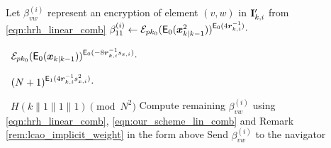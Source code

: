 \documentclass[10pt,letterpaper,oneside,twocolumn,journal]{IEEEtran}
\theoremstyle{definition}
\theoremstyle{definition}
\theoremstyle{remark}
\begin{document}
\begin{algorithm}[htbp]
\begin{algorithmic}[1]
    \State Let $\beta_{vw}^{(i)}$ represent an encryption of element $(v,w)$ in ${{\mathbf{I}}}'_{k,i}$ from \eqref{eqn:hrh_linear_comb}
    \State $\beta_{11}^{(i)} \gets \mathcal{E}_{pk_0}(\mathsf{E}_{0}({\boldsymbol{x}}^2_{k|k-1}))^{\mathsf{E}_{0}(4{\boldsymbol{r}}_{k, i}^{-1})}\cdot$\par
    \ $\mathcal{E}_{pk_0}(\mathsf{E}_{0}({\boldsymbol{x}}_{k|k-1}))^{\mathsf{E}_{0}(-8{\boldsymbol{r}}_{k, i}^{-1}s_{x,i})}\cdot$\par
    \ $(N+1)^{\mathsf{E}_{1}(4{\boldsymbol{r}}_{k, i}^{-1}s_{x,i}^2)}\cdot$\par
    \ $H(k\mathbin\|1\mathbin\|1\mathbin\|1)\pmod{N^2}$
    \State Compute remaining $\beta_{vw}^{(i)}$ using \eqref{eqn:hrh_linear_comb}, \eqref{eqn:our_scheme_lin_comb} and Remark \ref{rem:lcao_implicit_weight} in the form above
            \State Send $\beta_{vw}^{(i)}$ to the navigator
        \EndFor
    \EndFor
    \EndProcedure
\end{algorithmic}
\end{algorithm}
\end{document}
